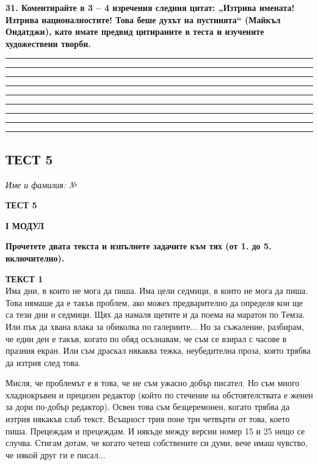 \documentclass[12pt,a4paper]{article}
\begin{document}
\noindent
\textbf{31. Коментирайте в 3 – 4 изречения следния цитат: „Изтрива имената! Изтрива националностите! Това беше духът на пустинята“ (Майкъл Ондатджи), като имате предвид цитираните в теста и изучените художествени творби.}\\

\noindent\rule{\linewidth}{0.4pt}
\noindent\rule{\linewidth}{0.4pt}
\noindent\rule{\linewidth}{0.4pt}
\noindent\rule{\linewidth}{0.4pt}
\noindent\rule{\linewidth}{0.4pt}
\noindent\rule{\linewidth}{0.4pt}
\noindent\rule{\linewidth}{0.4pt}
\noindent\rule{\linewidth}{0.4pt}
\noindent\rule{\linewidth}{0.4pt}

\newpage

\subsection{ТЕСТ 5}

\noindent
\textit{Име и фамилия:} \dotfill \textit{№} \makebox[2cm]{\dotfill}

\vspace{0.6cm}

\begin{center}
{\large\bfseries ТЕСТ 5}
\end{center}

\vspace{0.3cm}

\noindent
\textbf{І МОДУЛ}

\vspace{0.2cm}

\noindent
\textbf{Прочетете двата текста и изпълнете задачите към тях (от 1. до 5. включително).}

\vspace{0.6cm}

\noindent
\textbf{ТЕКСТ 1} \\
Има дни, в които не мога да пиша. Има цели седмици, в които не мога да пиша. Това нямаше да е такъв проблем, ако можех предварително да определя кои ще са тези дни и седмици. Щях да намаля щетите и да поема на маратон по Темза. Или пък да хвана влака за обиколка по галериите... Но за съжаление, разбирам, че един ден е такъв, когато по обяд осъзнавам, че съм се взирал с часове в празния екран. Или съм драскал някаква тежка, неубедителна проза, която трябва да изтрия след това.

Мисля, че проблемът е в това, че не съм ужасно добър писател. Но съм много хладнокръвен и прецизен редактор (който по стечение на обстоятелствата е женен за дори по-добър редактор). Освен това съм безцеремонен, когато трябва да изтрия някакъв слаб текст. Всъщност трия поне три четвърти от това, което пиша. Прецеждам и прецеждам. И някъде между версии номер 15 и 25 нещо се случва. Стигам дотам, че когато четеш собствените си думи, вече имаш чувство, че някой друг ги е писал...
\end{document}
